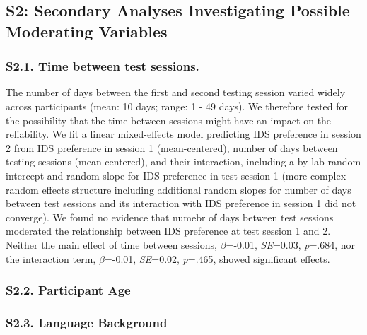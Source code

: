 \documentclass[
  man, donotrepeattitle,floatsintext]{apa6}
\begin{document}
\hypertarget{s2-secondary-analyses-investigating-possible-moderating-variables}{%
\subsection{S2: Secondary Analyses Investigating Possible Moderating Variables}\label{s2-secondary-analyses-investigating-possible-moderating-variables}}

\hypertarget{s2.1.-time-between-test-sessions.}{%
\subsubsection{S2.1. Time between test sessions.}\label{s2.1.-time-between-test-sessions.}}

The number of days between the first and second testing session varied widely across participants (mean: 10 days; range: 1 - 49 days). We therefore tested for the possibility that the time between sessions might have an impact on the reliability. We fit a linear mixed-effects model predicting IDS preference in session 2 from IDS preference in session 1 (mean-centered), number of days between testing sessions (mean-centered), and their interaction, including a by-lab random intercept and random slope for IDS preference in test session 1 (more complex random effects structure including additional random slopes for number of days between test sessions and its interaction with IDS preference in session 1 did not converge). We found no evidence that numebr of days between test sessions moderated the relationship between IDS preference at test session 1 and 2. Neither the main effect of time between sessions, \(\beta\)=-0.01, \emph{SE}=0.03, \emph{p}=.684, nor the interaction term, \(\beta\)=-0.01, \emph{SE}=0.02, \emph{p}=.465, showed significant effects.

\hypertarget{s2.2.-participant-age}{%
\subsubsection{S2.2. Participant Age}\label{s2.2.-participant-age}}

\hypertarget{s2.3.-language-background}{%
\subsubsection{S2.3. Language Background}\label{s2.3.-language-background}}
\end{document}
